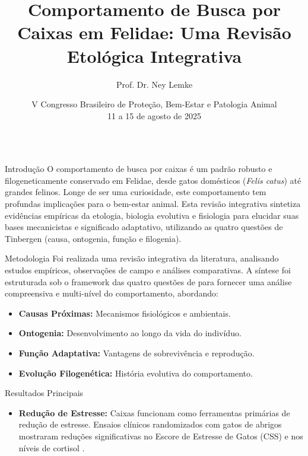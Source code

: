\documentclass[final]{beamer}
\title{Comportamento de Busca por Caixas em Felidae: Uma Revisão Etológica Integrativa}
\author{Prof. Dr. Ney Lemke}
\institute{Universidade Estadual Paulista (UNESP), Instituto de Biociências, Botucatu, SP}
\date{V Congresso Brasileiro de Proteção, Bem-Estar e Patologia Animal \\ 11 a 15 de agosto de 2025}
\begin{document}
\begin{frame}[t] 
  \maketitle

  \begin{columns}[T]

    \begin{column}{.32\linewidth}
      \begin{block}{Introdução}
        O comportamento de busca por caixas é um padrão robusto e filogeneticamente conservado em Felidae, desde gatos domésticos (\textit{Felis catus}) até grandes felinos. Longe de ser uma curiosidade, este comportamento tem profundas implicações para o bem-estar animal. Esta revisão integrativa sintetiza evidências empíricas da etologia, biologia evolutiva e fisiologia para elucidar suas bases mecanicistas e significado adaptativo, utilizando as quatro questões de Tinbergen (causa, ontogenia, função e filogenia).
      \end{block}
      \begin{block}{Metodologia}
        Foi realizada uma revisão integrativa da literatura, analisando estudos empíricos, observações de campo e análises comparativas. A síntese foi estruturada sob o framework das quatro questões de \citet{tinbergen1963} para fornecer uma análise compreensiva e multi-nível do comportamento, abordando:
        \begin{itemize}
            \item \textbf{Causas Próximas:} Mecanismos fisiológicos e ambientais.
            \item \textbf{Ontogenia:} Desenvolvimento ao longo da vida do indivíduo.
            \item \textbf{Função Adaptativa:} Vantagens de sobrevivência e reprodução.
            \item \textbf{Evolução Filogenética:} História evolutiva do comportamento.
        \end{itemize}
      \end{block}
      \begin{block}{Resultados Principais}
        \begin{itemize}
            \item \textbf{Redução de Estresse:} Caixas funcionam como ferramentas primárias de redução de estresse. Ensaios clínicos randomizados com gatos de abrigos mostraram reduções significativas no Escore de Estresse de Gatos (CSS) e nos níveis de cortisol \citep{vinke2014}.

\end{itemize}
\end{block}
\end{column}
\end{columns}
\end{frame}
\end{document}
